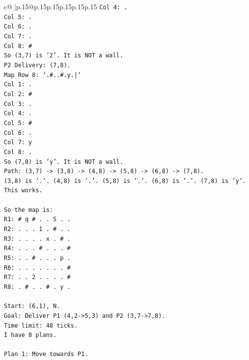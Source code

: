 \documentclass{article}
\begin{document}
{\begin{supertabular}{c@{$\;$}|p{.15\linewidth}@{}p{.15\linewidth}p{.15\linewidth}p{.15\linewidth}p{.15\linewidth}p{.15\linewidth}}
{{{\texttt{Col 4: .} \\
\texttt{Col 5: .} \\
\texttt{Col 6: .} \\
\texttt{Col 7: .} \\
\texttt{Col 8: \#} \\
\texttt{So (3,7) is '2'. It is NOT a wall.} \\
\texttt{P2 Delivery: (7,8).} \\
\texttt{Map Row 8: `.\#..\#.y.|`} \\
\texttt{Col 1: .} \\
\texttt{Col 2: \#} \\
\texttt{Col 3: .} \\
\texttt{Col 4: .} \\
\texttt{Col 5: \#} \\
\texttt{Col 6: .} \\
\texttt{Col 7: y} \\
\texttt{Col 8: .} \\
\texttt{So (7,8) is 'y'. It is NOT a wall.} \\
\texttt{Path: (3,7) {-}> (3,8) {-}> (4,8) {-}> (5,8) {-}> (6,8) {-}> (7,8).} \\
\texttt{(3,8) is '.'. (4,8) is '.'. (5,8) is '.'. (6,8) is '.'. (7,8) is 'y'.} \\
\texttt{This works.} \\
\\ 
\texttt{So the map is:} \\
\texttt{R1: \# q \# . . S . .} \\
\texttt{R2: . . . 1 . \# . .} \\
\texttt{R3: . . . . x . \# .} \\
\texttt{R4: . . . \# . . . \#} \\
\texttt{R5: . . \# . . . p .} \\
\texttt{R6: . . . . . . . \#} \\
\texttt{R7: . . 2 . . . . \#} \\
\texttt{R8: . \# . . \# . y .} \\
\\ 
\texttt{Start: (6,1), N.} \\
\texttt{Goal: Deliver P1 (4,2{-}>5,3) and P2 (3,7{-}>7,8).} \\
\texttt{Time limit: 48 ticks.} \\
\texttt{I have 8 plans.} \\
\\ 
\texttt{Plan 1: Move towards P1.} \\
}}}
\end{supertabular}}
\end{document}
